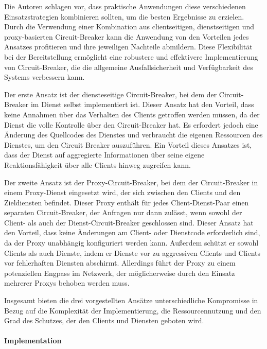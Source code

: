 Die Autoren schlagen vor, dass praktische Anwendungen diese verschiedenen Einsatzstrategien
kombinieren sollten, um die besten Ergebnisse zu erzielen.
Durch die Verwendung einer Kombination aus clientseitigen, dienstseitigen und proxy-basierten Circuit-Breaker
kann die Anwendung von den Vorteilen jedes Ansatzes profitieren und ihre jeweiligen Nachteile abmildern.
Diese Flexibilität bei der Bereitstellung ermöglicht eine robustere und effektivere Implementierung von Circuit-Breaker,
die die allgemeine Ausfallsicherheit und Verfügbarkeit des Systems verbessern kann.


Der erste Ansatz ist der diensteseitige Circuit-Breaker, bei dem der Circuit-Breaker im Dienst selbst implementiert ist.
Dieser Ansatz hat den Vorteil, dass keine Annahmen über das Verhalten des Clients getroffen werden müssen,
da der Dienst die volle Kontrolle über den Circuit-Breaker hat.
Es erfordert jedoch eine Änderung des Quellcodes des Dienstes und verbraucht die eigenen Ressourcen des Dienstes,
um den Circuit Breaker auszuführen.
Ein Vorteil dieses Ansatzes ist, dass der Dienst auf aggregierte Informationen über seine eigene Reaktionsfähigkeit
über alle Clients hinweg zugreifen kann.

Der zweite Ansatz ist der Proxy-Circuit-Breaker,
bei dem der Circuit-Breaker in einem Proxy-Dienst eingesetzt wird, der sich zwischen den Clients und den
Zieldiensten befindet.
Dieser Proxy enthält für jedes Client-Dienst-Paar einen separaten Circuit-Breaker, der Anfragen nur dann zulässt,
wenn sowohl der Client- als auch der Dienst-Circuit-Breaker geschlossen sind.
Dieser Ansatz hat den Vorteil, dass keine Änderungen am Client- oder Dienstcode erforderlich sind,
da der Proxy unabhängig konfiguriert werden kann.
Außerdem schützt er sowohl Clients als auch Dienste, indem er Dienste vor zu aggressiven Clients und Clients
vor fehlerhaften Diensten abschirmt.
Allerdings führt der Proxy zu einem potenziellen Engpass im Netzwerk,
der möglicherweise durch den Einsatz mehrerer Proxys behoben werden muss.

Insgesamt bieten die drei vorgestellten Ansätze unterschiedliche Kompromisse in Bezug auf die Komplexität der Implementierung,
die Ressourcennutzung und den Grad des Schutzes, der den Clients und Diensten geboten wird.

\paragraph{Implementation}


